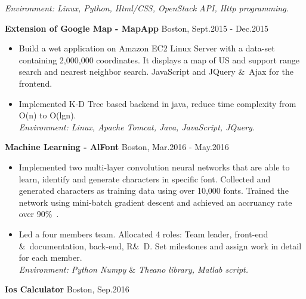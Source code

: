 \documentclass{resume} %
\begin{document}
\begin{spacing}{1}
\begin{center}
\begin{itemize}
\hspace{-10.0mm}\textit{Environment: Linux, Python,  Html/CSS, OpenStack API, Http programming.}
\vspace{-1mm}
\end{itemize}
\vspace{0mm}
\vspace{1.7mm}
{\bf Extension of Google Map - MapApp} \hfill {\small  Boston, Sept.2015 - Dec.2015} \\
\vspace{0.1mm}
\begin{itemize}
\item{Build a wet application on Amazon EC2 Linux Server with a data-set containing 2,000,000 coordinates. It displays a map of US and support range search and nearest neighbor search. JavaScript and JQuery \&\ Ajax for the frontend.} \\
\item{Implemented K-D Tree based backend in java, reduce time complexity from O(n) to O(lgn).  } \\
\hspace{-10.0mm}\textit{Environment: Linux, Apache Tomcat, Java, JavaScript, JQuery.}
\vspace{-2mm}
\end{itemize}
\vspace{2.4mm}
{\bf Machine Learning - AlFont} \hfill {\small Boston, Mar.2016 - May.2016} \\
\vspace{0.1mm}
\begin{itemize}
\item{Implemented two multi-layer convolution neural networks that are able to learn, identify and generate characters in specific font. Collected and generated characters as training data using over 10,000 fonts. Trained the network using mini-batch gradient descent and achieved an accruancy rate over 90\%\ . } \\
\item{Led a four members team. Allocated 4 roles: Team leader, front-end \&\ documentation, back-end, R\&\ D. Set milestones and assign work in detail for each member.} \\
\hspace{-10.0mm}\textit{Environment: Python Numpy $\&$ Theano library, Matlab script.}
\vspace{-1mm}
\end{itemize}
\vspace{1.8mm}
{\bf Ios Calculator} \hfill {\small Boston, Sep.2016} \\

\end{center}
\end{spacing}
\end{document}
